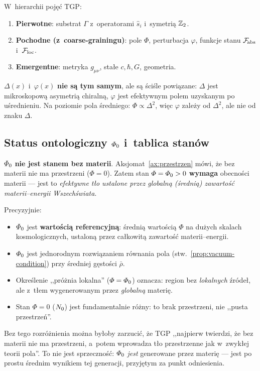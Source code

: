 \begin{remark}\label{rem:co-pierwotne}
W~hierarchii poj\k{e}\'c TGP:
\begin{enumerate}[nosep]
  \item \textbf{Pierwotne}: substrat $\Gamma$ z~operatorami
    $\hat{s}_i$ i~symetri\k{a} $\mathbb{Z}_2$.
  \item \textbf{Pochodne (z~coarse-grainingu)}: pole $\Phi$,
    perturbacja $\varphi$, funkcje stanu $\mathcal{F}_{\!\mathrm{abs}}$
    i~$\mathcal{F}_{\mathrm{loc}}$.
  \item \textbf{Emergentne}: metryka $g_{\mu\nu}$, sta\l{}e
    $c,\hbar,G$, geometria.
\end{enumerate}
$\Delta(x)$ i~$\varphi(x)$ \textbf{nie s\k{a} tym samym}, ale
s\k{a} \'sci\'sle powi\k{a}zane: $\Delta$ jest mikroskopow\k{a}
asymetri\k{a} chiralną, $\varphi$ jest efektywnym polem uzyskanym
po u\'srednieniu. Na poziomie pola \'sredniego: $\Phi \propto
\Delta^2$, wi\k{e}c $\varphi$ zale\.zy od $\Delta^2$, ale nie
od znaku $\Delta$.
\end{remark}

\subsection{Status ontologiczny $\varPhi_0$ i~tablica stan\'ow}\label{ssec:PhiZero-status}

\begin{remark}\label{rem:PhiZero-status}
$\varPhi_0$ \textbf{nie jest stanem bez materii}.
Aksjomat~\ref{ax:przestrzen} m\'owi, \.ze bez materii nie ma
przestrzeni ($\Phi = 0$). Zatem stan $\varPhi = \varPhi_0 > 0$
\textbf{wymaga} obecno\'sci materii --- jest to
\emph{efektywne t\l{}o ustalone przez globaln\k{a}
(\'sredni\k{a}) zawarto\'s\'c materii--energii Wszech\'swiata}.

Precyzyjnie:
\begin{itemize}[nosep]
  \item $\varPhi_0$ jest \textbf{warto\'sci\k{a} referencyjn\k{a}}:
    \'sredni\k{a} warto\'sci\k{a} $\Phi$ na du\.zych skalach
    kosmologicznych, ustaloną przez ca\l{}kowit\k{a} zawarto\'s\'c
    materii--energii.
  \item $\varPhi_0$ jest jednorodnym rozwi\k{a}zaniem r\'ownania
    pola (stw.~\ref{prop:vacuum-condition}) przy \'sredniej
    g\k{e}sto\'sci $\bar{\rho}$.
  \item Okre\'slenie ,,pr\'o\.znia lokalna'' ($\varPhi = \varPhi_0$)
    oznacza: region bez \emph{lokalnych} \'zr\'ode\l{}, ale
    z~t\l{}em wygenerowanym przez \emph{globaln\k{a}} materi\k{e}.
  \item Stan $\Phi = 0$ ($N_0$) jest fundamentalnie
    r\'o\.zny: to brak przestrzeni, nie ,,pusta przestrze\'n''.
\end{itemize}
Bez tego rozr\'o\.znienia mo\.zna by\l{}oby zarzuci\'c, \.ze TGP
,,najpierw twierdzi, \.ze bez materii nie ma przestrzeni,
a~potem wprowadza t\l{}o przestrzenne jak w~zwyk\l{}ej teorii
pola''. To nie jest sprzeczno\'s\'c: $\varPhi_0$ \emph{jest}
generowane przez materi\k{e} --- jest po prostu \'srednim
wynikiem tej generacji, przyj\k{e}tym za punkt odniesienia.
\end{remark}

